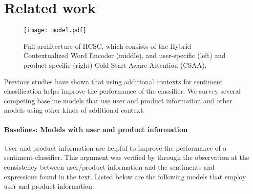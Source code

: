 \documentclass[11pt,a4paper]{article}
\begin{document}
\section{Related work}
\label{sec:rel}

\begin{figure*}[t]
    \centering
    \texttt{[image: model.pdf]}
    \caption{Full architecture of HCSC, which consists of the Hybrid Contextualized Word Encoder (middle), and user-specific (left) and product-specific (right) Cold-Start Aware Attention (CSAA).}
    \label{fig:model}
\end{figure*}

Previous studies have shown that using additional contexts for sentiment classification helps improve the performance of the classifier. We survey several competing baseline models that use user and product information and other models using other kinds of additional context.

\paragraph{Baselines: Models with user and product information}

User and product information are helpful to improve the performance of a sentiment classifier. This argument was verified by \citet{tang2015learning} through the observation at the consistency between user/product information and the sentiments and expressions found in the text. Listed below are the following models that employ user and product information:
\end{document}
